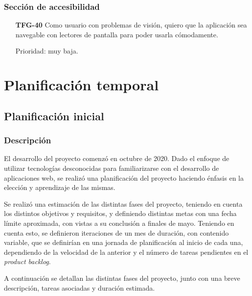\documentclass[10pt, a4paper]{aqademic}
\begin{document}
\subsubsection*{Sección de accesibilidad}

\begin{itemize}[leftmargin=16mm]
	\item [\textbf{TFG-40}] Como usuario con problemas de visión, quiero que la aplicación sea navegable con lectores de pantalla para poder usarla cómodamente.
	
	Prioridad: muy baja. 
\end{itemize}


\section{Planificación temporal}

\subsection{Planificación inicial}

\subsubsection{Descripción}

El desarrollo del proyecto comenzó en octubre de 2020. Dado el enfoque de utilizar tecnologías desconocidas para familiarizarse con el desarrollo
de aplicaciones web, se realizó una planificación del proyecto haciendo énfasis en la elección y aprendizaje de las mismas.

Se realizó una estimación de las distintas fases del proyecto, teniendo en cuenta los distintos objetivos y requisitos, y definiendo distintas metas con
una fecha límite aproximada, con vistas a su conclusión a finales de mayo. Teniendo en cuenta esto, se definieron iteraciones de un mes de duración, con contenido variable, que se definirían en una jornada de planificación al inicio de cada una, dependiendo de la velocidad de la anterior y el número de tareas pendientes en el \textit{product backlog}.

A continuación se detallan las distintas fases del proyecto, junto con una breve descripción, tareas asociadas y duración estimada.
\end{document}
